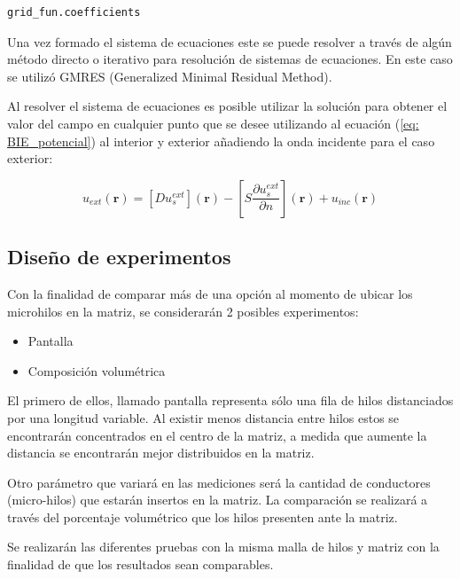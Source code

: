 \documentclass[12pt,letterpaper]{article}
\numberwithin{equation}{section}
\begin{document}
\begin{lstlisting}
grid_fun.coefficients
\end{lstlisting} 

Una vez formado el sistema de ecuaciones este se puede resolver a través de algún método directo o iterativo para resolución de sistemas de ecuaciones. En este caso se utilizó GMRES (Generalized Minimal Residual Method).

Al resolver el sistema de ecuaciones es posible utilizar la solución para obtener el valor del campo en cualquier punto que se desee utilizando al ecuación (\ref{eq: BIE_potencial}) al interior y exterior añadiendo la onda incidente para el caso exterior:

$$u_{ext}(\textbf{r})=\left[D u^{ext}_s\right](\textbf{r}) - \left[S \frac{\partial u^{ext}_s}{\partial n}\right](\textbf{r}) + u_{inc}(\textbf{r})$$
\subsection{Diseño de experimentos}
Con la finalidad de comparar más de una opción al momento de ubicar los microhilos en la matriz, se considerarán 2 posibles experimentos:

\begin{itemize}
	\item Pantalla
	\item Composición volumétrica
\end{itemize}

El primero de ellos, llamado pantalla representa sólo una fila de hilos distanciados por una longitud variable. Al existir menos distancia entre hilos estos se encontrarán concentrados en el centro de la matriz, a medida que aumente la distancia se encontrarán mejor distribuidos en la matriz.

Otro parámetro que variará en las mediciones será la cantidad de conductores (micro-hilos) que estarán insertos en la matriz. La comparación se realizará a través del porcentaje volumétrico que los hilos presenten ante la matriz. 

Se realizarán las diferentes pruebas con la misma malla de hilos y matriz con la finalidad de que los resultados sean comparables.
\end{document}
